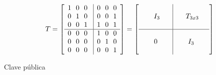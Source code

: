 \begin{equation}\label{eq:ej-T}
{T} = \left[
	\begin{array}{c|c}
		1\ \ 0\ \ 0\ & 0\ \ 0\ \ 0\\
		0\ \ 1\ \ 0\ & 0\ \ 0\ \ 1\\
		0\ \ 0\ \ 1\ & 1\ \ 0\ \ 1\\
		\hline
		0\ \ 0\ \ 0\ & 1\ \ 0\ \ 0\\
		0\ \ 0\ \ 0\ & 0\ \ 1\ \ 0\\
		0\ \ 0\ \ 0\ & 0\ \ 0\ \ 1
	\end{array}
	\right] =
	\left[
	\begin{array}{c|c}
	\\
	\ \ \ \ \ I_3\ \ \ \ & \ \ \ \ T_{3x3} \ \ \  \\
	\\
	\hline
	\\
	0 & I_3\\
	\\
	\end{array}
	\right]
\end{equation}


Clave pública

